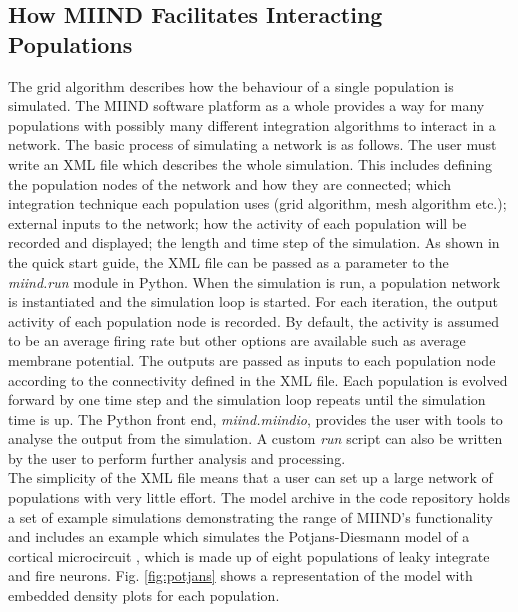 \documentclass[utf8]{frontiersSCNS} %
\begin{document}
\subsection{How MIIND Facilitates Interacting Populations}
The grid algorithm describes how the behaviour of a single population is simulated. The MIIND software platform as a whole provides a way for many populations with possibly many different integration algorithms to interact in a network. The basic process of simulating a network is as follows. The user must write an XML file which describes the whole simulation. This includes defining the population nodes of the network and how they are connected; which integration technique each population uses (grid algorithm, mesh algorithm etc.); external inputs to the network; how the activity of each population will be recorded and displayed; the length and time step of the simulation. As shown in the quick start guide, the XML file can be passed as a parameter to the \textit{miind.run} module in Python. When the simulation is run, a population network is instantiated and the simulation loop is started. For each iteration, the output activity of each population node is recorded. By default, the activity is assumed to be an average firing rate but other options are available such as average membrane potential. The outputs are passed as inputs to each population node according to the connectivity defined in the XML file. Each population is evolved forward by one time step and the simulation loop repeats until the simulation time is up. The Python front end, \textit{miind.miindio}, provides the user with tools to analyse the output from the simulation. A custom \textit{run} script can also be written by the user to perform further analysis and processing.\\

The simplicity of the XML file means that a user can set up a large network of populations with very little effort. The model archive in the code repository holds a set of example simulations demonstrating the range of MIIND's functionality and includes an example which simulates the Potjans-Diesmann model of a cortical microcircuit \citep{potjans2014cell}, which is made up of eight populations of leaky integrate and fire neurons. Fig. \ref{fig:potjans} shows a representation of the model with embedded density plots for each population.\\
\end{document}

